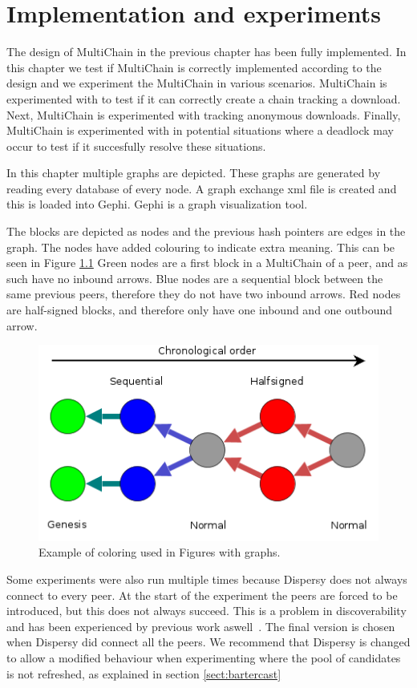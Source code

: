 \chapter{Implementation and experiments}
The design of MultiChain in the previous chapter has been fully implemented.
In this chapter we test if MultiChain is correctly implemented according to the design
and we experiment the MultiChain in various scenarios.
MultiChain is experimented with to test if it can correctly create a chain tracking a download.
Next, MultiChain is experimented with tracking anonymous downloads.
Finally, MultiChain is experimented with in potential situations where a deadlock may occur
to test if it succesfully resolve these situations.

In this chapter multiple graphs are depicted.
These graphs are generated by reading every database of every node.
A graph exchange xml file is created and this is loaded into Gephi.
Gephi is a graph visualization tool.

The blocks are depicted as nodes and the previous hash pointers are edges in the graph.
The nodes have added colouring to indicate extra meaning.
This can be seen in Figure \ref{fig:graph-example}
Green nodes are a first block in a MultiChain of a peer,
and as such have no inbound arrows.
Blue nodes are a sequential block between the same previous peers,
therefore they do not have two inbound arrows.
Red nodes are half-signed blocks,
and therefore only have one inbound and one outbound arrow.

\begin{figure}[!h]
	\centerline{\includegraphics[scale=0.6]{experimentation/example.png}}
	\caption{Example of coloring used in Figures with graphs.}
	\label{fig:graph-example}
\end{figure}

Some experiments were also run multiple times because Dispersy does not always connect to every peer.
At the start of the experiment the peers are forced to be introduced,
but this does not always succeed.
This is a problem in discoverability and has been experienced by previous work aswell~\cite{ruigrok-anonymous}.
The final version is chosen when Dispersy did connect all the peers.
We recommend that Dispersy is changed to allow a modified behaviour when experimenting
where the pool of candidates is not refreshed,
as explained in section \ref{sect:bartercast}

